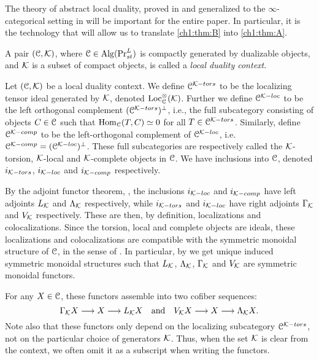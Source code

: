 The theory of abstract local duality, proved in \cite{hovey-palmiery-strickland_97} and generalized to the $\infty$-categorical setting in \cite{barthel-heard-valenzuela_2018} will be important for the entire paper. In particular, it is the technology that will allow us to translate \cref{ch1:thm:B} into \cref{ch1:thm:A}. 

\begin{definition}
    \label{ch1:def:local-duality-context}
    A pair $(\EuScript{C}, \mathcal{K})$, where $\EuScript{C}\in \operatorname{Alg}(\mathrm{Pr}_{st}^L)$ is compactly generated by dualizable objects, and $\mathcal{K}$ is a subset of compact objects, is called a \emph{local duality context}.
\end{definition}

\begin{construction}
    Let $(\EuScript{C}, \mathcal{K})$ be a local duality context. We define $\EuScript{C}^{\mathcal{K}-tors}$ to be the localizing tensor ideal generated by $\mathcal{K}$, denoted $\operatorname{Loc}^\otimes_{\EuScript{C}}(\mathcal{K})$. Further we define $\EuScript{C}^{\mathcal{K}-loc}$ to be the left orthogonal complement $(\EuScript{C}^{\mathcal{K}-tors})^\perp$, i.e., the full subcategory consisting of objects $C\in \EuScript{C}$ such that $\operatorname{Hom}_{\EuScript{C}}(T,C)\simeq 0$ for all $T\in \EuScript{C}^{\mathcal{K}-tors}$. Similarly, define $\EuScript{C}^{\mathcal{K}-comp}$ to be the left-orthogonal complement of $\EuScript{C}^{\mathcal{K}-loc}$, i.e. $\EuScript{C}^{\mathcal{K}-comp}= (\EuScript{C}^{\mathcal{K}-loc})^\perp$. These full subcategories are respectively called the $\mathcal{K}$-torsion, $\mathcal{K}$-local and $\mathcal{K}$-complete objects in $\EuScript{C}$. We have inclusions into $\EuScript{C}$, denoted $i_{\mathcal{K}-tors}$, $i_{\mathcal{K}-loc}$ and $i_{\mathcal{K}-comp}$ respectively. 
    
    By the adjoint functor theorem, \cite[5.5.2.9]{lurie_09}, the inclusions $i_{\mathcal{K}-loc}$ and $i_{\mathcal{K}-comp}$ have left adjoints $L_{\mathcal{K}}$ and $\Lambda_{\mathcal{K}}$ respectively, while $i_{\mathcal{K}-tors}$ and $i_{\mathcal{K}-loc}$ have right adjoints $\Gamma_{\mathcal{K}}$ and $V_{\mathcal{K}}$ respectively. These are then, by definition, localizations and colocalizations. Since the torsion, local and complete objects are ideals, these localizations and colocalizations are compatible with the symmetric monoidal structure of $\EuScript{C}$, in the sense of \cite[2.2.1.7]{Lurie_HA}. In particular, by \cite[2.2.1.9]{Lurie_HA} we get unique induced symmetric monoidal structures such that $L_{\mathcal{K}}$, $\Lambda_{\mathcal{K}}$, $\Gamma_{\mathcal{K}}$ and $V_{\mathcal{K}}$ are symmetric monoidal functors. 

    For any $X\in \EuScript{C}$, these functors assemble into two cofiber sequences:
    $$\Gamma_{\mathcal{K}} X \longrightarrow X \longrightarrow L_{\mathcal{K}} X \quad \text{and}\quad V_{\mathcal{K}} X \longrightarrow X \longrightarrow \Lambda_{\mathcal{K}} X.$$
    Note also that these functors only depend on the localizing subcategory $\EuScript{C}^{\mathcal{K}-tors}$, not on the particular choice of generators $\mathcal{K}$. Thus, when the set $\mathcal{K}$ is clear from the context, we often omit it as a subscript when writing the functors. 
\end{construction}

